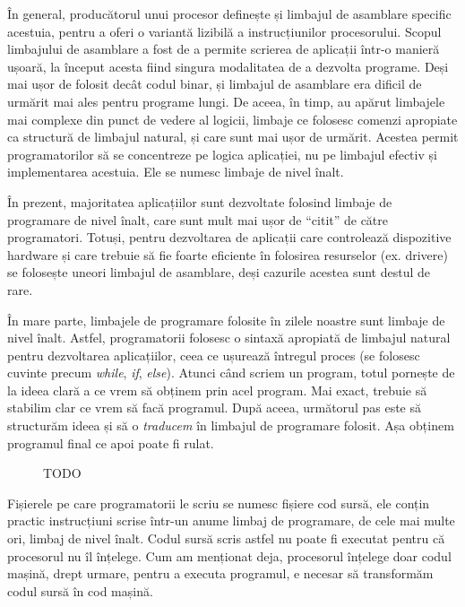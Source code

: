 În general, producătorul unui procesor definește și limbajul de asamblare
specific acestuia, pentru a oferi o variantă lizibilă a instrucțiunilor
procesorului. Scopul limbajului de asamblare a fost de a permite scrierea de
aplicații într-o manieră ușoară, la început acesta fiind singura modalitatea de
a dezvolta programe. Deși mai ușor de folosit decât codul binar, și limbajul de
asamblare era dificil de urmărit mai ales pentru programe lungi. De aceea, în
timp, au apărut limbajele mai complexe din punct de vedere al logicii, limbaje
ce folosesc comenzi apropiate ca structură de limbajul natural, și care sunt mai
ușor de urmărit. Acestea permit programatorilor să se concentreze pe logica
aplicației, nu pe limbajul efectiv și implementarea acestuia. Ele se numesc
limbaje de nivel înalt.

În prezent, majoritatea aplicațiilor sunt dezvoltate folosind limbaje de
programare de nivel înalt, care sunt mult mai ușor de “citit” de către
programatori. Totuși, pentru dezvoltarea de aplicații care controlează
dispozitive hardware și care trebuie să fie foarte eficiente în folosirea
resurselor (ex. drivere) se folosește uneori limbajul de asamblare, deși
cazurile acestea sunt destul de rare.

În mare parte, limbajele de programare folosite în zilele noastre sunt limbaje
de nivel înalt. Astfel, programatorii folosesc o sintaxă apropiată de limbajul
natural pentru dezvoltarea aplicațiilor, ceea ce ușurează întregul proces (se
folosesc cuvinte precum \textit{while}, \textit{if}, \textit{else}). Atunci
când scriem un program, totul pornește de la ideea clară a ce vrem să obținem
prin acel program. Mai exact, trebuie să stabilim clar ce vrem să facă
programul. După aceea, următorul pas este să structurăm ideea și să o
\textit{traducem} în limbajul de programare folosit. Așa obținem programul final
ce apoi poate fi rulat.

\begin{figure}[htbp]
	\centering
	\def\svgwidth{\columnwidth}
	
	\caption{TODO}
\end{figure}

Fișierele pe care programatorii le scriu se numesc fișiere cod sursă, ele conțin
practic instrucțiuni scrise într-un anume limbaj de programare, de cele mai
multe ori, limbaj de nivel înalt. Codul sursă scris astfel nu poate fi executat
pentru că procesorul nu îl înțelege. Cum am menționat deja, procesorul înțelege
doar codul mașină, drept urmare, pentru a executa programul, e necesar să
transformăm codul sursă în cod mașină.

